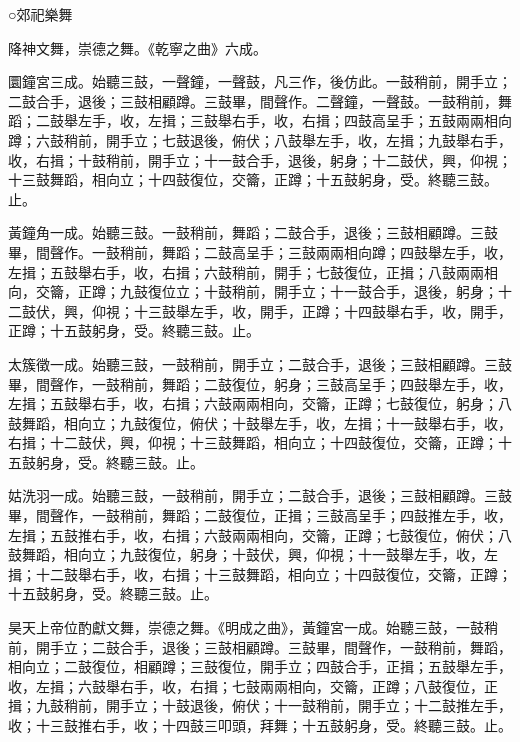 
\begin{pinyinscope}

 ○郊祀樂舞



 降神文舞，崇德之舞。《乾寧之曲》六成。



 圜鐘宮三成。始聽三鼓，一聲鐘，一聲鼓，凡三作，後仿此。一鼓稍前，開手立；二鼓合手，退後；三鼓相顧蹲。三鼓畢，間聲作。二聲鐘，一聲鼓。一鼓稍前，舞蹈；二鼓舉左手，收，左揖；三鼓舉右手，收，右揖；四鼓高呈手；五鼓兩兩相向蹲；六鼓稍前，開手立；七鼓退後，俯伏；八鼓舉左手，收，左揖；九鼓舉右手，收，右揖；十鼓稍前，開手立；十一鼓合手，退後，躬身；十二鼓伏，興，仰視；十三鼓舞蹈，相向立；十四鼓復位，交籥，正蹲；十五鼓躬身，受。終聽三鼓。止。



 黃鐘角一成。始聽三鼓。一鼓稍前，舞蹈；二鼓合手，退後；三鼓相顧蹲。三鼓畢，間聲作。一鼓稍前，舞蹈；二鼓高呈手；三鼓兩兩相向蹲；四鼓舉左手，收，左揖；五鼓舉右手，收，右揖；六鼓稍前，開手；七鼓復位，正揖；八鼓兩兩相向，交籥，正蹲；九鼓復位立；十鼓稍前，開手立；十一鼓合手，退後，躬身；十二鼓伏，興，仰視；十三鼓舉左手，收，開手，正蹲；十四鼓舉右手，收，開手，正蹲；十五鼓躬身，受。終聽三鼓。止。



 太簇徵一成。始聽三鼓，一鼓稍前，開手立；二鼓合手，退後；三鼓相顧蹲。三鼓畢，間聲作，一鼓稍前，舞蹈；二鼓復位，躬身；三鼓高呈手；四鼓舉左手，收，左揖；五鼓舉右手，收，右揖；六鼓兩兩相向，交籥，正蹲；七鼓復位，躬身；八鼓舞蹈，相向立；九鼓復位，俯伏；十鼓舉左手，收，左揖；十一鼓舉右手，收，右揖；十二鼓伏，興，仰視；十三鼓舞蹈，相向立；十四鼓復位，交籥，正蹲；十五鼓躬身，受。終聽三鼓。止。



 姑洗羽一成。始聽三鼓，一鼓稍前，開手立；二鼓合手，退後；三鼓相顧蹲。三鼓畢，間聲作，一鼓稍前，舞蹈；二鼓復位，正揖；三鼓高呈手；四鼓推左手，收，左揖；五鼓推右手，收，右揖；六鼓兩兩相向，交籥，正蹲；七鼓復位，俯伏；八鼓舞蹈，相向立；九鼓復位，躬身；十鼓伏，興，仰視；十一鼓舉左手，收，左揖；十二鼓舉右手，收，右揖；十三鼓舞蹈，相向立；十四鼓復位，交籥，正蹲；十五鼓躬身，受。終聽三鼓。止。



 昊天上帝位酌獻文舞，崇德之舞。《明成之曲》，黃鐘宮一成。始聽三鼓，一鼓稍前，開手立；二鼓合手，退後；三鼓相顧蹲。三鼓畢，間聲作，一鼓稍前，舞蹈，相向立；二鼓復位，相顧蹲；三鼓復位，開手立；四鼓合手，正揖；五鼓舉左手，收，左揖；六鼓舉右手，收，右揖；七鼓兩兩相向，交籥，正蹲；八鼓復位，正揖；九鼓稍前，開手立；十鼓退後，俯伏；十一鼓稍前，開手立；十二鼓推左手，收；十三鼓推右手，收；十四鼓三叩頭，拜舞；十五鼓躬身，受。終聽三鼓。止。




\end{pinyinscope}
